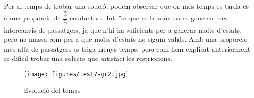 Per al temps de trobar una so\lgem ució, podem observar que on més temps es tarda es a una proporcio de $\dfrac{2}{5}$ conductors.
Intuïm que es la zona on es generen mes intercanvis de passatgers, ja que n'hi ha suficients per a generar molts d'estats,
pero no massa com per a que molts d'estats no siguin valids.
Amb una proporcio mes alta de passatgers es triga menys temps, pero com hem explicat anteriorment es dificil trobar una solucio que satisfaci les restriccions.

\begin{figure}[H]
\begin{center}
 \texttt{[image: figures/test7-gr2.jpg]}
 \label{test7-gr2}
\end{center}
\caption{Evolució del temps}
\end{figure}
        
